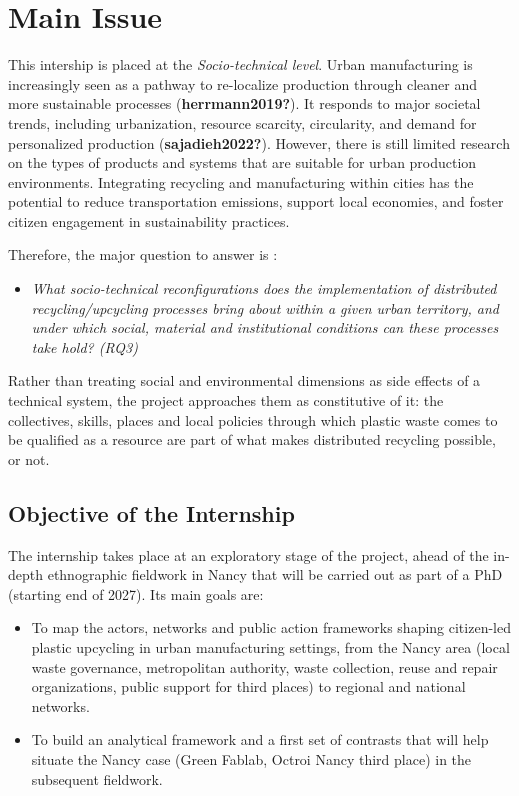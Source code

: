 \documentclass[
  12pt,
  openany]{book}
\providecommand{\tightlist}{%
  \setlength{\itemsep}{0pt}\setlength{\parskip}{0pt}}
\begin{document}
\chapter{Main Issue}\label{main-issue}

This intership is placed at the \emph{Socio-technical level}. Urban
manufacturing is increasingly seen as a pathway to re-localize
production through cleaner and more sustainable processes
(\textbf{herrmann2019?}). It responds to major societal trends,
including urbanization, resource scarcity, circularity, and demand for
personalized production (\textbf{sajadieh2022?}). However, there is
still limited research on the types of products and systems that are
suitable for urban production environments. Integrating recycling and
manufacturing within cities has the potential to reduce transportation
emissions, support local economies, and foster citizen engagement in
sustainability practices.

Therefore, the major question to answer is :

\begin{itemize}
\tightlist
\item
  \emph{What socio-technical reconfigurations does the implementation of
  distributed recycling/upcycling processes bring about within a given
  urban territory, and under which social, material and institutional
  conditions can these processes take hold? (RQ3)}
\end{itemize}

Rather than treating social and environmental dimensions as side effects
of a technical system, the project approaches them as constitutive of
it: the collectives, skills, places and local policies through which
plastic waste comes to be qualified as a resource are part of what makes
distributed recycling possible, or not.

\section{Objective of the Internship}\label{objective-of-the-internship}

The internship takes place at an exploratory stage of the project, ahead
of the in-depth ethnographic fieldwork in Nancy that will be carried out
as part of a PhD (starting end of 2027). Its main goals are:

\begin{itemize}
\tightlist
\item
  To map the actors, networks and public action frameworks shaping
  citizen-led plastic upcycling in urban manufacturing settings, from
  the Nancy area (local waste governance, metropolitan authority, waste
  collection, reuse and repair organizations, public support for third
  places) to regional and national networks.
\item
  To build an analytical framework and a first set of contrasts that
  will help situate the Nancy case (Green Fablab, Octroi Nancy third
  place) in the subsequent fieldwork.
\end{itemize}
\end{document}

